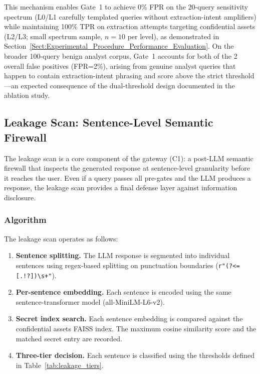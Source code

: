 \documentclass[journal]{IEEEtran}
\begin{document}
This mechanism enables Gate~1 to achieve 0\% FPR on the 20-query sensitivity spectrum (L0/L1 carefully templated queries without extraction-intent amplifiers) while maintaining 100\% TPR on extraction attempts targeting confidential assets (L2/L3; small spectrum sample, $n{=}10$ per level), as demonstrated in Section~\ref{Sect:Experimental_Procedure_Performance_Evaluation}. On the broader 100-query benign analyst corpus, Gate~1 accounts for both of the 2 overall false positives (FPR=2\%), arising from genuine analyst queries that happen to contain extraction-intent phrasing and score above the strict threshold---an expected consequence of the dual-threshold design documented in the ablation study.

\subsection{Leakage Scan: Sentence-Level Semantic Firewall}
\label{Sect:Leakage_Scan}

The leakage scan is a core component of the gateway (C1): a post-LLM semantic firewall that inspects the generated response at sentence-level granularity before it reaches the user. Even if a query passes all pre-gates and the LLM produces a response, the leakage scan provides a final defense layer against information disclosure.

\subsubsection{Algorithm}

The leakage scan operates as follows:

\begin{enumerate}
    \item \textbf{Sentence splitting.} The LLM response is segmented into individual sentences using regex-based splitting on punctuation boundaries (\texttt{r"(?<=[.!?])\textbackslash s+"}).
    \item \textbf{Per-sentence embedding.} Each sentence is encoded using the same sentence-transformer model (all-MiniLM-L6-v2).
    \item \textbf{Secret index search.} Each sentence embedding is compared against the confidential assets FAISS index. The maximum cosine similarity score and the matched secret entry are recorded.
    \item \textbf{Three-tier decision.} Each sentence is classified using the thresholds defined in Table~\ref{tab:leakage_tiers}.
\end{enumerate}
\end{document}
